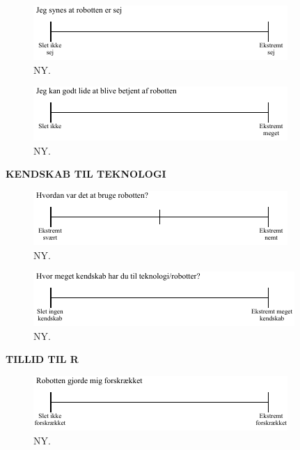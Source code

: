 \noindent
%
%
\begin{figure}[H]
\centering
\includegraphics[width =\textwidth]{Figure/UdvalgteSkalaer/SejR} 
\caption{NY.}
\label{fig:SkalaSejR}
\end{figure}
\noindent
%
%
\begin{figure}[H]
\centering
\includegraphics[width =\textwidth]{Figure/UdvalgteSkalaer/BetjeningAfR} 
\caption{NY.}
\label{fig:SkalaBetjeningAfR}
\end{figure}
\noindent
%
\textbf{KENDSKAB TIL TEKNOLOGI}\\
%
\begin{figure}[H]
\centering
\includegraphics[width =\textwidth]{Figure/UdvalgteSkalaer/HvordanVarDetAtBrugeR} 
\caption{NY.}
\label{fig:SkalaHvordanVarDetAtBrugeR}
\end{figure}
\noindent
%
%
\begin{figure}[H]
\centering
\includegraphics[width =\textwidth]{Figure/UdvalgteSkalaer/KendskabTilTeknologi} 
\caption{NY.}
\label{fig:SkalaKendskabTilTeknologi}
\end{figure}
\noindent
%
\textbf{TILLID TIL R}
%
\begin{figure}[H]
\centering
\includegraphics[width =\textwidth]{Figure/UdvalgteSkalaer/Forskraekket} 
\caption{NY.}
\label{fig:SkalaForskraekket}
\end{figure}
